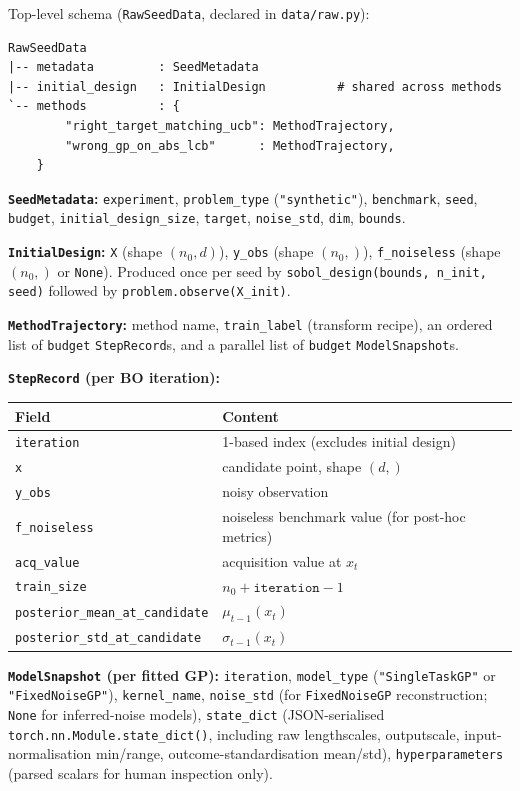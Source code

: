\documentclass[11pt]{article}
\begin{document}
\medskip
Top-level schema (\texttt{RawSeedData}, declared in \texttt{data/raw.py}):
\begin{lstlisting}
RawSeedData
|-- metadata         : SeedMetadata
|-- initial_design   : InitialDesign          # shared across methods
`-- methods          : {
        "right_target_matching_ucb": MethodTrajectory,
        "wrong_gp_on_abs_lcb"      : MethodTrajectory,
    }
\end{lstlisting}
 
\textbf{\texttt{SeedMetadata}:}
\texttt{experiment}, \texttt{problem\_type} (\texttt{"synthetic"}),
\texttt{benchmark}, \texttt{seed}, \texttt{budget}, \texttt{initial\_design\_size},
\texttt{target}, \texttt{noise\_std}, \texttt{dim}, \texttt{bounds}.
 
\textbf{\texttt{InitialDesign}:}
\texttt{X} (shape $(n_0, d)$), \texttt{y\_obs} (shape $(n_0,)$),
\texttt{f\_noiseless} (shape $(n_0,)$ or \texttt{None}).
Produced once per seed by \texttt{sobol\_design(bounds, n\_init, seed)}
followed by \texttt{problem.observe(X\_init)}.
 
\textbf{\texttt{MethodTrajectory}:}
method name, \texttt{train\_label} (transform recipe),
an ordered list of \texttt{budget} \texttt{StepRecord}s,
and a parallel list of \texttt{budget} \texttt{ModelSnapshot}s.
 
\textbf{\texttt{StepRecord} (per BO iteration):}
\begin{center}
\begin{tabular}{ll}
\toprule
Field & Content \\
\midrule
\texttt{iteration} & 1-based index (excludes initial design) \\
\texttt{x}         & candidate point, shape $(d,)$ \\
\texttt{y\_obs}    & noisy observation \\
\texttt{f\_noiseless} & noiseless benchmark value (for post-hoc metrics) \\
\texttt{acq\_value} & acquisition value at $x_t$ \\
\texttt{train\_size} & $n_0 + \texttt{iteration} - 1$ \\
\texttt{posterior\_mean\_at\_candidate} & $\mu_{t-1}(x_t)$ \\
\texttt{posterior\_std\_at\_candidate}  & $\sigma_{t-1}(x_t)$ \\
\bottomrule
\end{tabular}
\end{center}
 
\textbf{\texttt{ModelSnapshot} (per fitted GP):}
\texttt{iteration}, \texttt{model\_type} (\texttt{"SingleTaskGP"} or
\texttt{"FixedNoiseGP"}), \texttt{kernel\_name},
\texttt{noise\_std} (for \texttt{FixedNoiseGP} reconstruction;
\texttt{None} for inferred-noise models),
\texttt{state\_dict} (JSON-serialised \texttt{torch.nn.Module.state\_dict()},
including raw lengthscales, outputscale, input-normalisation min/range,
outcome-standardisation mean/std),
\texttt{hyperparameters} (parsed scalars for human inspection only).
 
\end{document}
